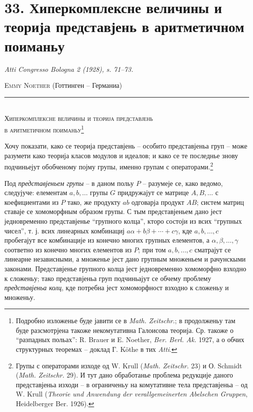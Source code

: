 ﻿\documentclass[11pt]{article}
\begin{document}
\section*{33. Хиперкомплексне величины и теорија представјень в аритметичном поиманьу}
\emph{Atti Congresso Bologna 2 (1928), s. 71--73.}

\begin{center}
\textsc{Emmy Noether} (Готтинген -- Германиа)\\[-0.1em]
\rule{3em}{0.4pt}\\[0.8em]
\textsc{Хиперкомплексне величины и теорија представјень}\\
\textsc{в аритметичном поиманьу}\footnote{Подробно изложенье буде јавити се в \emph{Math. Zeitschr.}; в продолженьу там буде разсмотрјена такоже некомутативна Галоисова теорија. Ср. такоже о “разпадных польах”: R. Brauer и E. Noether, \emph{Ber. Berl. Ak.} 1927, а о обчих структурных теоремах -- доклад Г. Köthe в тих \emph{Atti}.}
\end{center}

Хочу показати, како се теорија представјень -- особито представјеньа груп -- може разумети како теорија класов модулов и идеалов; и како се те последнье знову подчиньејут обобченому појму групы, именно групам с операторами.\footnote{Групы с операторами изходе од W. Krull (\emph{Math. Zeitschr.} 23) и О. Schmidt (\emph{Math. Zeitschr.} 29). И тут дано обработанье проблема редукције даного представјеньа изходи -- в ограниченьу на комутативне тела представјеньа -- од W. Krull (\emph{Theorie und Anwendung der verallgemeinerten Abelschen Gruppen}, Heidelberger Ber. 1926).}

Под \emph{представјеньем групы} -- в даном польу $P$ -- разумеје се, како ведомо, следујуче: елементам $a,b,\ldots$ групы $G$ придружајут се матрице $A,B,\ldots$ с коефициентами из $P$ тако, же продукту $ab$ одговарја продукт $AB$; систем матриц ставаје се хомоморфным образом групы. С тым представјеньем дано јест једновременно представјенье “групного колца”, кторо состоји из всих “групных чисел”, т. ј. всих линеарных комбинациј $a\alpha+b\beta+\cdots+c\gamma$, кде $a,b,\ldots,c$ пробегајут все комбинације из конечно многих групных елементов, а $\alpha,\beta,\ldots,\gamma$ соответно из конечно многих елементов из $P$; при том $a,b,\ldots,c$ сматрајут се линеарне независными, а множенье јест дано групным множеньем и рачунскыми законами. Представјенье групного колца јест једновременно хомоморфно взходно к сложеньу; тако представјеньа груп подчиньајут се обчему проблему \emph{представјеньа колц}, кде потребна јест хомоморфност взходно к сложеньу и множеньу.
\end{document}
